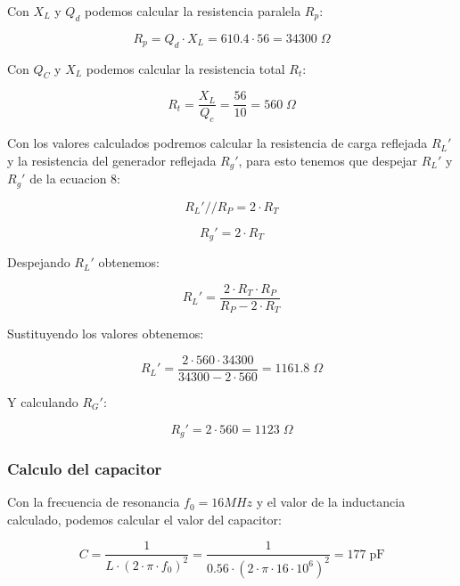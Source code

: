 Con $X_L$ y $Q_d$ podemos calcular la resistencia paralela $R_p$:

\begin{equation}
    R_p = Q_d \cdot X_L = 610.4 \cdot 56 = 34300\; \Omega
\end{equation}

Con $Q_C$ y $X_L$ podemos calcular la resistencia total $R_t$:

\begin{equation}
    R_t = \frac{X_L}{Q_c} = \frac{56}{10} = 560\; \Omega
\end{equation}

Con los valores calculados podremos calcular la resistencia de carga reflejada $R_L'$ y la resistencia del generador reflejada $R_g'$, para esto tenemos que despejar $R_L'$ y $R_g'$ de la ecuacion 8:

\begin{equation}
    R_L' // R_P = 2 \cdot R_T 
\end{equation}

\begin{equation}
    R_g' = 2 \cdot R_T 
\end{equation}

Despejando $R_L'$ obtenemos:

\begin{equation}
    R_L' = \frac{2 \cdot R_T \cdot R_P}{R_P - 2 \cdot R_T} 
\end{equation}

Sustituyendo los valores obtenemos:

\begin{equation}
    R_L' = \frac{2 \cdot 560 \cdot 34300}{34300 - 2 \cdot 560} = 1161.8\; \Omega
\end{equation}

Y calculando $R_G'$:

\begin{equation}
    R_g' = 2 \cdot 560 = 1123\; \Omega
\end{equation}


\subsubsection{Calculo del capacitor}

Con la frecuencia de resonancia $f_0 = 16 MHz$ y el valor de la inductancia calculado, podemos calcular el valor del capacitor:

\begin{equation}
    C = \frac{1}{L \cdot (2 \cdot \pi \cdot f_0)^2} = \frac{1}{0.56 \cdot (2 \cdot \pi \cdot 16 \cdot 10^6)^2} = 177\; \text{pF}
\end{equation}

